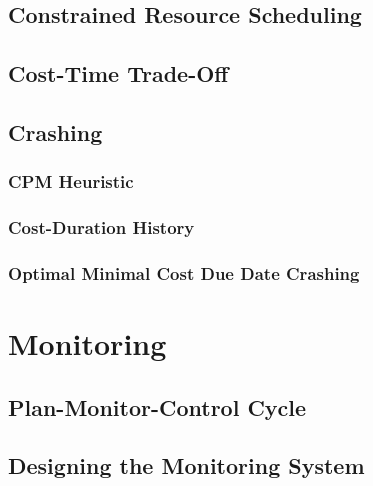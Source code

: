     \section{Constrained Resource Scheduling} %

    \section{Cost-Time Trade-Off} %

    \section{Crashing} %

        \subsection{CPM Heuristic} %

        \subsection{Cost-Duration History} %

        \subsection{Optimal Minimal Cost Due Date Crashing} %

\chapter{Monitoring} %

    \section{Plan-Monitor-Control Cycle} %

    \section{Designing the Monitoring System} %

